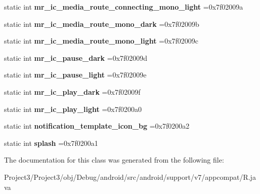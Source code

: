 \begin{DoxyCompactItemize}
static int {\bfseries mr\+\_\+ic\+\_\+media\+\_\+route\+\_\+connecting\+\_\+mono\+\_\+light} =0x7f02009a
\item 
\mbox{\label{classandroid_1_1support_1_1v7_1_1appcompat_1_1R_1_1drawable_a6b4800870a6ee62acd3e39cb8f4c856c}} 
static int {\bfseries mr\+\_\+ic\+\_\+media\+\_\+route\+\_\+mono\+\_\+dark} =0x7f02009b
\item 
\mbox{\label{classandroid_1_1support_1_1v7_1_1appcompat_1_1R_1_1drawable_ac9229bb2f866552d5f9468f0e2af732d}} 
static int {\bfseries mr\+\_\+ic\+\_\+media\+\_\+route\+\_\+mono\+\_\+light} =0x7f02009c
\item 
\mbox{\label{classandroid_1_1support_1_1v7_1_1appcompat_1_1R_1_1drawable_ae69a0257739c5a161fdf4375a00653a1}} 
static int {\bfseries mr\+\_\+ic\+\_\+pause\+\_\+dark} =0x7f02009d
\item 
\mbox{\label{classandroid_1_1support_1_1v7_1_1appcompat_1_1R_1_1drawable_a71d155d7b673ec774cfc153fc5cb1d45}} 
static int {\bfseries mr\+\_\+ic\+\_\+pause\+\_\+light} =0x7f02009e
\item 
\mbox{\label{classandroid_1_1support_1_1v7_1_1appcompat_1_1R_1_1drawable_a9a822ca9e66f080f28b0782a1181a903}} 
static int {\bfseries mr\+\_\+ic\+\_\+play\+\_\+dark} =0x7f02009f
\item 
\mbox{\label{classandroid_1_1support_1_1v7_1_1appcompat_1_1R_1_1drawable_ad6ed7f496303d0354282e39a1ba08835}} 
static int {\bfseries mr\+\_\+ic\+\_\+play\+\_\+light} =0x7f0200a0
\item 
\mbox{\label{classandroid_1_1support_1_1v7_1_1appcompat_1_1R_1_1drawable_a9d870d6e70faa6030fad56ef1783daa3}} 
static int {\bfseries notification\+\_\+template\+\_\+icon\+\_\+bg} =0x7f0200a2
\item 
\mbox{\label{classandroid_1_1support_1_1v7_1_1appcompat_1_1R_1_1drawable_ac4000dd2f4d1bb1e089bb96862532dca}} 
static int {\bfseries splash} =0x7f0200a1
\end{DoxyCompactItemize}


The documentation for this class was generated from the following file\+:\begin{DoxyCompactItemize}
\item 
Project3/\+Project3/obj/\+Debug/android/src/android/support/v7/appcompat/R.\+java\end{DoxyCompactItemize}
